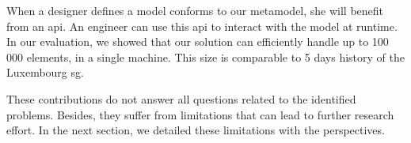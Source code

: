 When a designer defines a \gls{model} conforms to our \gls{metamodel}, she will benefit from an \gls{api}.
An engineer can use this \gls{api} to interact with the \gls{model} at runtime.
In our evaluation, we showed that our solution can efficiently handle up to 100\,000 elements, in a single machine. 
This size is comparable to 5 days history of the Luxembourg \gls{sg}.

These contributions do not answer all questions related to the identified problems.
Besides, they suffer from limitations that can lead to further research effort.
In the next section, we detailed these limitations with the perspectives.